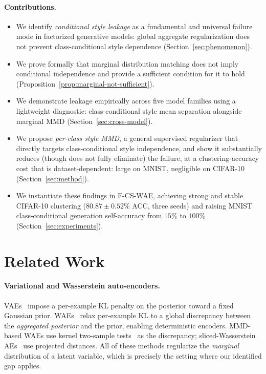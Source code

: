 \documentclass[10pt]{article}
\begin{document}
\paragraph{Contributions.}
\begin{itemize}
  \item We identify \emph{conditional style leakage} as a fundamental and universal
        failure mode in factorized generative models: global aggregate regularization
        does not prevent class-conditional style dependence
        (Section~\ref{sec:phenomenon}).
  \item We prove formally that marginal distribution matching does not imply
        conditional independence and provide a sufficient condition for it to hold
        (Proposition~\ref{prop:marginal-not-sufficient}).
  \item We demonstrate leakage empirically across five model families using a
        lightweight diagnostic: class-conditional style mean separation alongside
        marginal MMD (Section~\ref{sec:cross-model}).
  \item We propose \emph{per-class style MMD}, a general supervised regularizer that
        directly targets class-conditional style independence, and show it substantially
        reduces (though does not fully eliminate) the failure, at a clustering-accuracy
        cost that is dataset-dependent: large on MNIST, negligible on CIFAR-10
        (Section~\ref{sec:method}).
  \item We instantiate these findings in F-CS-WAE, achieving strong and stable
        CIFAR-10 clustering ($80.87\pm0.52\%$ ACC, three seeds) and raising MNIST
        class-conditional generation self-accuracy from $15\%$ to $100\%$
        (Section~\ref{sec:experiments}).
\end{itemize}

\section{Related Work}

\paragraph{Variational and Wasserstein auto-encoders.}
VAEs~\citep{kingma2013autoencoding} impose a per-example KL penalty on the posterior
toward a fixed Gaussian prior.
WAEs~\citep{tolstikhin2017wasserstein} relax per-example KL to a global discrepancy
between the \emph{aggregated posterior} and the prior, enabling deterministic
encoders.
MMD-based WAEs use kernel two-sample tests~\citep{gretton2012kernel} as the
discrepancy; sliced-Wasserstein AEs~\citep{kolouri2018sliced} use projected
distances.
All of these methods regularize the \emph{marginal} distribution of a latent variable,
which is precisely the setting where our identified gap applies.
\end{document}
